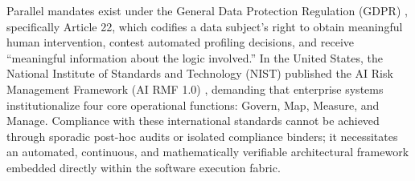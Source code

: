 \documentclass[journal]{IEEEtran}
\begin{document}
Parallel mandates exist under the General Data Protection Regulation (GDPR) \cite{wachter2017counterfactual}, specifically Article 22, which codifies a data subject's right to obtain meaningful human intervention, contest automated profiling decisions, and receive ``meaningful information about the logic involved.'' In the United States, the National Institute of Standards and Technology (NIST) published the AI Risk Management Framework (AI RMF 1.0) \cite{nist_ai_rmf2023}, demanding that enterprise systems institutionalize four core operational functions: Govern, Map, Measure, and Manage. Compliance with these international standards cannot be achieved through sporadic post-hoc audits or isolated compliance binders; it necessitates an automated, continuous, and mathematically verifiable architectural framework embedded directly within the software execution fabric.
\end{document}
